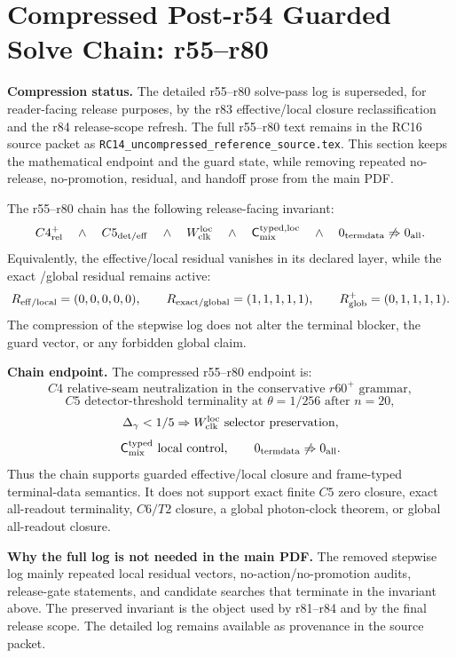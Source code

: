 \section{Compressed Post-r54 Guarded Solve Chain: r55--r80}
\label{sec:rc16-compressed-r55-r80-guarded-solve-chain}

\noindent\textbf{Compression status.}
The detailed r55--r80 solve-pass log is superseded, for reader-facing release purposes, by
the r83 effective/local closure reclassification and the r84 release-scope refresh.  The
full r55--r80 text remains in the RC16 source packet as
\texttt{RC14\_uncompressed\_reference\_source.tex}.  This section keeps the mathematical
endpoint and the guard state, while removing repeated no-release, no-promotion, residual,
and handoff prose from the main PDF.

\begin{theoremlet}
\label{thm:rc16-r55-r80-compression-invariant}
The r55--r80 chain has the following release-facing invariant:
\[
C4_{\rm rel}^{+}\quad\wedge\quad C5_{\rm det/eff}\quad\wedge\quad
W_{\rm clk}^{\rm loc}\quad\wedge\quad
\mathsf C_{\rm mix}^{\rm typed,loc}\quad\wedge\quad
0_{\rm termdata}\not\Rightarrow 0_{\rm all}.
\]
Equivalently, the effective/local residual vanishes in its declared layer, while the exact
/global residual remains active:
\[
R_{\rm eff/local}=(0,0,0,0,0),\qquad
R_{\rm exact/global}=(1,1,1,1,1),\qquad
R_{\rm glob}^{+}=(0,1,1,1,1).
\]
The compression of the stepwise log does not alter the terminal blocker, the guard vector,
or any forbidden global claim.
\end{theoremlet}

\noindent\textbf{Chain endpoint.}
The compressed r55--r80 endpoint is:
\[
C4\text{ relative-seam neutralization in the conservative }r60^{+}\text{ grammar},
\]
\[
C5\text{ detector-threshold terminality at }\theta=1/256\text{ after }n=20,
\]
\[
\Delta_\gamma<1/5\Rightarrow W_{\rm clk}^{\rm loc}\text{ selector preservation},
\]
\[
\mathsf C_{\rm mix}^{\rm typed}\text{ local control},\qquad
0_{\rm termdata}\not\Rightarrow0_{\rm all}.
\]
Thus the chain supports guarded effective/local closure and frame-typed terminal-data
semantics.  It does not support exact finite \(C5\) zero closure, exact all-readout
terminality, \(C6/T2\) closure, a global photon-clock theorem, or global all-readout
closure.

\noindent\textbf{Why the full log is not needed in the main PDF.}
The removed stepwise log mainly repeated local residual vectors, no-action/no-promotion
audits, release-gate statements, and candidate searches that terminate in the invariant
above.  The preserved invariant is the object used by r81--r84 and by the final release
scope.  The detailed log remains available as provenance in the source packet.

